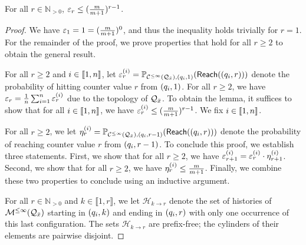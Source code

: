 \documentclass[a4paper,UKenglish,cleveref,autoref,thm-restate,colorlinks]{lipics-v2021}
\newcommand{\integerInterval}[1]{\llbracket{}#1\rrbracket{}}
\newcommand{\IN}{\mathbb{N}}
\newcommand{\INpos}{\IN_{>0}}
\newcommand{\mdp}{\mathcal{M}}
\newcommand{\histPart}{\mathcal{H}}
\newcommand{\ocmdp}{\mathcal{Q}}
\newcommand{\ocmdpFin}[2]{\mdp^{\leq #2}(#1)}
\newcommand{\ocState}{q}
\newcommand{\ocCount}{k}
\newcommand{\counterUB}{r}
\newcommand{\mchain}{\mathcal{C}}
\newcommand{\ocChainFin}[2]{\mchain^{\leq #2}(#1)}
\newcommand{\chainX}{\ocmdp_{\sqsxVect}}
\newcommand{\eleError}[1]{\varepsilon_{#1}}
\newcommand{\eleB}[1]{\eleError{#1}^{(\sqsi)}}
\newcommand{\eleD}[1]{\eta^{(\sqsi)}_{#1}}
\newcommand{\reach}[1]{\mathsf{Reach}(#1)}
\begin{document}
\begin{lemma}\label{lemma:sqrt-sum:bound:domination}
  For all $\counterUB\in\INpos$, $\eleError{\counterUB}\leq (\frac{\sqsm}{\sqsm+1})^{\counterUB-1}$.
\end{lemma}
\begin{proof}
  We have $\eleError{1}=1 = (\frac{\sqsm}{\sqsm+1})^0$, and thus the inequality holds trivially for $\counterUB=1$.
  For the remainder of the proof, we prove properties that hold for all $\counterUB\geq 2$ to obtain the general result.
  
  For all $\counterUB\geq 2$ and $\sqsi\in\integerInterval{1, \sqsn}$, let $\eleB{\counterUB} = \probaMCverb{\ocChainFin{\chainX}{\infty}}{(\ocState_\sqsi, 1)}(\reach{(\ocState_\sqsi, \counterUB)})$ denote the probability of hitting counter value $\counterUB$ from $(\ocState_\sqsi, 1)$.
  For all $\counterUB\geq 2$, we have $\eleError{\counterUB} = \frac{1}{\sqsn}\sum_{\sqsi=1}^\sqsn\eleB{\counterUB}$ due to the topology of $\chainX$.
  To obtain the lemma, it suffices to show that for all $\sqsi\in\integerInterval{1, \sqsn}$, we have $\eleB{\counterUB}\leq(\frac{\sqsm}{\sqsm+1})^{\counterUB-1}$.
  We fix $\sqsi\in\integerInterval{1, \sqsn}$.

  For all $\counterUB\geq 2$, we let $\eleD{\counterUB} =  \probaMCverb{\ocChainFin{\chainX}{\infty}}{(\ocState_\sqsi, \counterUB-1)}(\reach{(\ocState_\sqsi, \counterUB)})$ denote the probability of reaching counter value $\counterUB$ from $(\ocState_\sqsi, \counterUB-1)$.
  To conclude this proof, we establish three statements.
  First, we show that for all $\counterUB\geq 2$, we have $\eleB{\counterUB+1} = \eleB{\counterUB}\cdot\eleD{\counterUB+1}$.
  Second, we show that for all $\counterUB\geq 2$, we have $\eleD{\counterUB}\leq\frac{\sqsm}{\sqsm+1}$.
  Finally, we combine these two properties to conclude using an inductive argument.

  For all $\counterUB\in\INpos$ and $\ocCount\in\integerInterval{1, \counterUB}$, we let $\histPart_{\ocCount\to\counterUB}$ denote the set of histories of $\ocmdpFin{\chainX}{\infty}$ starting in $(\ocState_\sqsi,\ocCount)$ and ending in $(\ocState_\sqsi, \counterUB)$ with only one occurrence of this last configuration.
  The sets $\histPart_{\ocCount\to\counterUB}$ are prefix-free; the cylinders of their elements are pairwise disjoint.


\end{proof}
\end{document}
